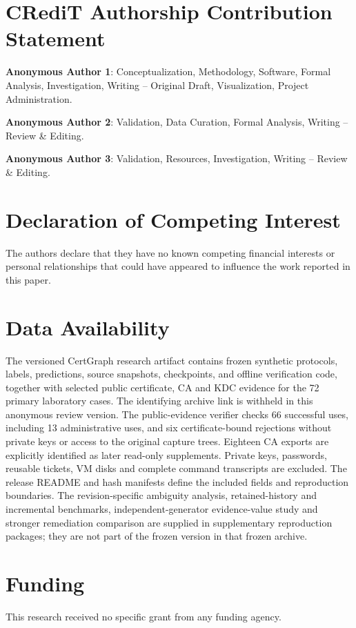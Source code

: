 \section*{CRediT Authorship Contribution Statement}
\noindent\textbf{Anonymous Author 1}: Conceptualization, Methodology, Software, Formal Analysis, Investigation, Writing -- Original Draft, Visualization, Project Administration.
\par\smallskip\noindent\textbf{Anonymous Author 2}: Validation, Data Curation, Formal Analysis, Writing -- Review \& Editing.
\par\smallskip\noindent\textbf{Anonymous Author 3}: Validation, Resources, Investigation, Writing -- Review \& Editing.

\section*{Declaration of Competing Interest}
\noindent The authors declare that they have no known competing financial interests or personal relationships that could have appeared to influence the work reported in this paper.

\section*{Data Availability}
\noindent The versioned CertGraph research artifact contains frozen synthetic protocols, labels, predictions, source snapshots, checkpoints, and offline verification code, together with selected public certificate, CA and KDC evidence for the 72 primary laboratory cases. The identifying archive link is withheld in this anonymous review version. The public-evidence verifier checks 66 successful uses, including 13 administrative uses, and six certificate-bound rejections without private keys or access to the original capture trees. Eighteen CA exports are explicitly identified as later read-only supplements. Private keys, passwords, reusable tickets, VM disks and complete command transcripts are excluded. The release README and hash manifests define the included fields and reproduction boundaries. The revision-specific ambiguity analysis, retained-history and incremental benchmarks, independent-generator evidence-value study and stronger remediation comparison are supplied in supplementary reproduction packages; they are not part of the frozen version in that frozen archive.

\section*{Funding}
\noindent This research received no specific grant from any funding agency.

